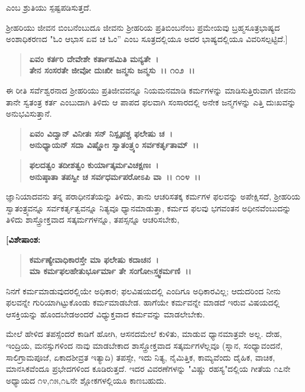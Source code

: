 \noindent
ಎಂಬ ಶ್ರುತಿಯು ಸ್ಪಷ್ಟಪಡಿಸುತ್ತದೆ.

ಶ‍್ರೀಹರಿಯು ಜೀವನ ಬಿಂಬನೆಂಬುದೂ ಜೀವನು ಶ‍್ರೀಹರಿಯ ಪ್ರತಿಬಿಂಬನೆಂಬ ಪ್ರಮೇಯವು ಬ್ರಹ್ಮಸೂತ್ರಭಾಷ್ಯದ ಅಂಶಾಧಿಕರಣದ "ಓಂ ಆಭಾಸ ಏವ ಚ ಓಂ” ಎಂಬ ಸೂತ್ರದಲ್ಲಿಯೂ ಅದರ ಭಾಷ್ಯದಲ್ಲಿಯೂ ವಿವರಿಸಲ್ಪಟ್ಟಿದೆ.]

\begin{verse}
\textbf{ಏವಂ ಕರ್ತರಿ ದೇವೇಶೇ ಕರ್ತಾಹಮಿತಿ ಮನ್ಯತೇ~।}\\\textbf{ತೇನ ಸಂಸರತೇ ಜೀವೋ ದುಃಖೀ ಜನ್ಮಸು ಜನ್ಮಸು~।। ೧೦೨~।।}
\end{verse}

ಈ ರೀತಿ ಸರ್ವೆಶ್ವರನಾದ ಶ‍್ರೀಹರಿಯು ಪ್ರತಿಜೀವವನ್ನೂ ನಿಯಮನಮಾಡಿ ಕರ್ಮಗಳನ್ನು ಮಾಡಿಸುತ್ತಿರುವಾಗ ಜೀವನು ತಾನೇ ಸ್ವತಂತ್ರ ಕರ್ತ ಎಂಬುದಾಗಿ ತಿಳಿದು ಆ ಪಾಪದ ಫಲವಾಗಿ ಸಂಸಾರದಲ್ಲಿ ಅನೇಕ ಜನ್ಮಗಳನ್ನು ಎತ್ತಿ ದುಃಖವನ್ನು ಅನುಭವಿಸುತ್ತಾನೆ.

\begin{verse}
\textbf{ಏವಂ ವಿದ್ವಾನ್ ವಿನೀತಃ ಸನ್ ನಿಸ್ಪೃಹಶ್ಚ ಫಲೇಷು ಚ~।}\\\textbf{ಅನುಧ್ಯಾಯನ್ ಸದಾ ವಿಷ್ಣೋಃ ಸ್ವಾತಂತ್ರ್ಯಂ ಸರ್ವಕರ್ತೃತಾಮ್~।। }
\end{verse}

\begin{verse}
\textbf{ಫಲದತ್ವಂ ತದೀಶತ್ವಂ ಕುರ್ಯಾತ್ಕರ್ಮವಿಚಕ್ಷಣಃ~।}\\\textbf{ಅನುಷ್ಠಾತಾ ತಪಸ್ವೀ ಚ ಸರ್ವಧರ್ಮಪರೋಽಪಿ ವಾ~।। ೧೦೪~।।}
\end{verse}

ಜ್ಞಾನಿಯಾದವನು ತನ್ನ ಪರಾಧೀನತೆಯನ್ನು ತಿಳಿದು, ತಾನು ಆಚರಿಸತಕ್ಕ ಕರ್ಮಗಳ ಫಲವನ್ನು ಅಪೇಕ್ಷಿಸದೆ, ಶ‍್ರೀಹರಿಯ ಸ್ವಾತಂತ್ರ್ಯವನ್ನೂ ಸರ್ವಕರ್ತೃತ್ವವನ್ನೂ ನಿತ್ಯವೂ ಧ್ಯಾನಮಾಡುತ್ತಾ, ಕರ್ಮದ ಫಲವು ಭಗವಂತನ ಅಧೀನವೆಂಬುದನ್ನು ತಿಳಿದು ಶಾಸ್ತ್ರೋಕ್ತವಾದ ಸತ್ಕರ್ಮಗಳನ್ನೂ, ತಪಸ್ಸನ್ನೂ ಆಚರಿಸಬೇಕು,

\begin{flushleft}
\textbf{[ವಿಶೇಷಾಂಶ:}
\end{flushleft}

\begin{verse}
\textbf{ಕರ್ಮಣ್ಯೇವಾಧಿಕಾರಸ್ತೇ ಮಾ ಫಲೇಷು ಕದಾಚನ~।}\\\textbf{ಮಾ ಕರ್ಮಫಲಹೇತುರ್ಭೂರ್ಮಾ ತೇ ಸಂಗೋsಸ್ತ್ವಕರ್ಮಣಿ~।।} 
\end{verse}

ನಿನಗೆ ಕರ್ಮಮಾಡುವುದರಲ್ಲಿಯೇ ಅಧಿಕಾರ; ಫಲವಿಷಯದಲ್ಲಿ ಎಂದಿಗೂ ಅಧಿಕಾರವಿಲ್ಲ; ಆದುದರಿಂದ ನೀನು ಫಲವನ್ನೇ ಗುರಿಯಾಗಿಟ್ಟುಕೊಂಡು ಕರ್ಮಮಾಡಬೇಡ. ಹಾಗೆಯೇ ಕರ್ಮವನ್ನೇ ಮಾಡದೆ ಇರುವ ವಿಷಯದಲ್ಲಿ ಆಸಕ್ತಿಯನ್ನು ಹೊಂದಬೇಡಅಂದರೆ ವಿಧ್ಯುಕ್ತವಾದ ಕರ್ಮವನ್ನು ಮಾಡಲೇಬೇಕು.

ಮೇಲೆ ಹೇಳಿದ ತಪಸ್ಸೆಂದರೆ ಕಾಡಿಗೆ ಹೋಗಿ, ಆಸನದಮೇಲೆ ಕುಳಿತು, ಮಾಡುವ ಧ್ಯಾನಮಾತ್ರವೇ ಅಲ್ಲ. ದೇಹ, ಇಂದ್ರಿಯ, ಮನಸ್ಸುಗಳಿಂದ ನಾವು ಮಾಡಬೇಕಾದ ಶಾಸ್ತ್ರೋಕ್ತವಾದ ಸತ್ಕರ್ಮಗಳೆಲ್ಲವೂ (ಸ್ನಾನ, ಸಂಧ್ಯಾವಂದನೆ, ಸಾಲಿಗ್ರಾಮಪೂಜೆ, ಏಕಾದಶೀವ್ರತ ಇತ್ಯಾದಿ) ತಪಸ್ಸೇ, ಇದು ನಿತ್ಯ, ನೈಮಿತ್ತಿಕ, ಕಾಮ್ಯವೆಂದು ದೈಹಿಕ, ವಾಚಿಕ, ಮಾನಸಿಕವೆಂದೂ ಪ್ರಭೇದಗಳಿಂದ ಕೂಡಿರುತ್ತದೆ. ಇದರ ವಿವರಣೆಗಳನ್ನು "ವಿಷ್ಣು ರಹಸ್ಯ"ದಲ್ಲಿಯ ಗೀತೆಯ ೧೭ನೇ ಅಧ್ಯಾಯದ ೧೪,೧೫,೧೬ನೇ ಶ್ಲೋಕಗಳಲ್ಲಿಯೂ ಕಾಣಬಹುದು.

